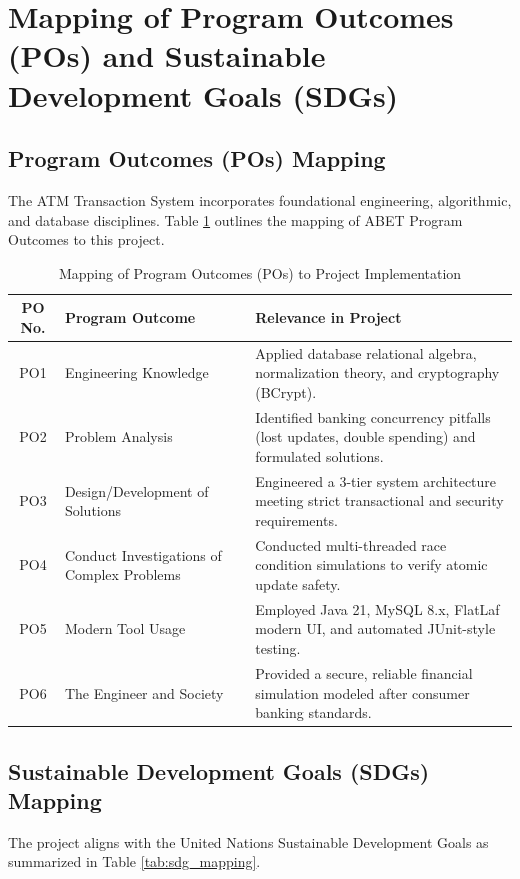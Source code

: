\documentclass[11pt,a4paper]{report}
\begin{document}
\newpage

\section{Mapping of Program Outcomes (POs) and Sustainable Development Goals (SDGs)}

\subsection{Program Outcomes (POs) Mapping}
The ATM Transaction System incorporates foundational engineering, algorithmic, and database disciplines. Table \ref{tab:po_mapping} outlines the mapping of ABET Program Outcomes to this project.

\begin{table}[htbp]
    \centering
    \caption{Mapping of Program Outcomes (POs) to Project Implementation}
    \renewcommand{\arraystretch}{1.3}
    \begin{tabular}{|c|p{6.5cm}|p{7cm}|}
        \hline
        \textbf{PO No.} & \textbf{Program Outcome} & \textbf{Relevance in Project} \\
        \hline
        PO1 & Engineering Knowledge & Applied database relational algebra, normalization theory, and cryptography (BCrypt). \\
        \hline
        PO2 & Problem Analysis & Identified banking concurrency pitfalls (lost updates, double spending) and formulated solutions. \\
        \hline
        PO3 & Design/Development of Solutions & Engineered a 3-tier system architecture meeting strict transactional and security requirements. \\
        \hline
        PO4 & Conduct Investigations of Complex Problems & Conducted multi-threaded race condition simulations to verify atomic update safety. \\
        \hline
        PO5 & Modern Tool Usage & Employed Java 21, MySQL 8.x, FlatLaf modern UI, and automated JUnit-style testing. \\
        \hline
        PO6 & The Engineer and Society & Provided a secure, reliable financial simulation modeled after consumer banking standards. \\
        \hline
    \end{tabular}
    \label{tab:po_mapping}
\end{table}

\subsection{Sustainable Development Goals (SDGs) Mapping}
The project aligns with the United Nations Sustainable Development Goals as summarized in Table \ref{tab:sdg_mapping}.
\end{document}
